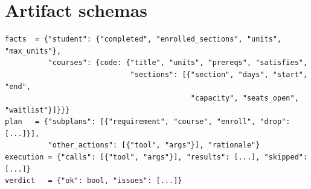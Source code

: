 \documentclass[11pt]{article}
\begin{document}
\section{Artifact schemas}
\label{app:schemas}
\begin{lstlisting}
facts  = {"student": {"completed", "enrolled_sections", "units", "max_units"},
          "courses": {code: {"title", "units", "prereqs", "satisfies",
                             "sections": [{"section", "days", "start", "end",
                                           "capacity", "seats_open", "waitlist"}]}}}
plan   = {"subplans": [{"requirement", "course", "enroll", "drop": [...]}],
          "other_actions": [{"tool", "args"}], "rationale"}
execution = {"calls": [{"tool", "args"}], "results": [...], "skipped": [...]}
verdict   = {"ok": bool, "issues": [...]}
\end{lstlisting}
\end{document}
